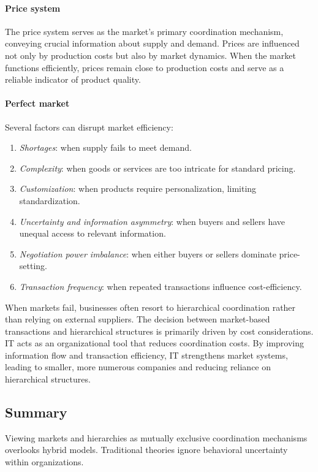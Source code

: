 \paragraph*{Price system}
The price system serves as the market's primary coordination mechanism, conveying crucial information about supply and demand. 
Prices are influenced not only by production costs but also by market dynamics. 
When the market functions efficiently, prices remain close to production costs and serve as a reliable indicator of product quality.

\paragraph*{Perfect market}
Several factors can disrupt market efficiency:
\begin{enumerate}
    \item \textit{Shortages}: when supply fails to meet demand.
    \item \textit{Complexity}: when goods or services are too intricate for standard pricing.
    \item \textit{Customization}: when products require personalization, limiting standardization.
    \item \textit{Uncertainty and information asymmetry}: when buyers and sellers have unequal access to relevant information.
    \item \textit{Negotiation power imbalance}: when either buyers or sellers dominate price-setting.
    \item \textit{Transaction frequency}: when repeated transactions influence cost-efficiency.
\end{enumerate}
\noindent When markets fail, businesses often resort to hierarchical coordination rather than relying on external suppliers. 
The decision between market-based transactions and hierarchical structures is primarily driven by cost considerations. 
IT acts as an organizational tool that reduces coordination costs. 
By improving information flow and transaction efficiency, IT strengthens market systems, leading to smaller, more numerous companies and reducing reliance on hierarchical structures.

\subsection{Summary}
Viewing markets and hierarchies as mutually exclusive coordination mechanisms overlooks hybrid models.
Traditional theories ignore behavioral uncertainty within organizations.